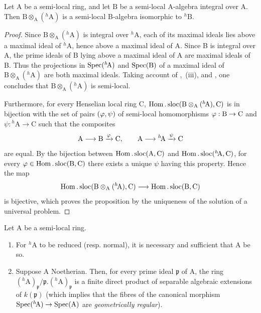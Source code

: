 \begin{proposition}[18.6.8]
\label{IV.18.6.8}
Let $\mathrm{A}$ be a semi-local ring, and let $\mathrm{B}$ be a semi-local A-algebra integral over $\mathrm{A}$.
Then $\mathrm{B}\otimes_{\mathrm{A}}({}^h\!\mathrm{A})$ is a semi-local B-algebra isomorphic to ${}^h\!\mathrm{B}$.
\end{proposition}

\begin{proof}
Since $\mathrm{B}\otimes_{\mathrm{A}}({}^h\!\mathrm{A})$ is integral over ${}^h\!\mathrm{A}$, each of its maximal ideals lies above a maximal ideal of ${}^h\!\mathrm{A}$, hence above a maximal ideal of A.  Since B is integral over A, the prime ideals of B lying above a maximal ideal of A are maximal ideals of B.  Thus the projections in $\operatorname{Spec}({}^h\!\mathrm{A})$ and $\operatorname{Spec}(\mathrm{B})$ of a maximal ideal of $\mathrm{B}\otimes_{\mathrm{A}}({}^h\!\mathrm{A})$ are both maximal ideals.  Taking account of ,~(iii), and , one concludes that $\mathrm{B}\otimes_{\mathrm{A}}({}^h\!\mathrm{A})$ is semi-local.

Furthermore, for every Henselian local ring C, $\operatorname{Hom}.\operatorname{sloc}(\mathrm{B}\otimes_{\mathrm{A}}({}^h\!\mathrm{A}),\mathrm{C})$ is in bijection with the set of pairs $(\varphi,\psi)$ of semi-local homomorphisms $\varphi:\mathrm{B}\to\mathrm{C}$ and $\psi:{}^h\!\mathrm{A}\to\mathrm{C}$ such that the composites
\[
  \mathrm{A}\longrightarrow\mathrm{B}\xrightarrow{\varphi}\mathrm{C},
  \qquad
  \mathrm{A}\longrightarrow{}^h\!\mathrm{A}\xrightarrow{\psi}\mathrm{C}
\]
are equal.  By the bijection between $\operatorname{Hom}.\operatorname{sloc}(\mathrm{A},\mathrm{C})$ and $\operatorname{Hom}.\operatorname{sloc}({}^h\!\mathrm{A},\mathrm{C})$, for every $\varphi\in\operatorname{Hom}.\operatorname{sloc}(\mathrm{B},\mathrm{C})$ there exists a unique $\psi$ having this property.  Hence the map
\[
  \operatorname{Hom}.\operatorname{sloc}(\mathrm{B}\otimes_{\mathrm{A}}({}^h\!\mathrm{A}),\mathrm{C})
  \longrightarrow \operatorname{Hom}.\operatorname{sloc}(\mathrm{B},\mathrm{C})
\]
is bijective, which proves the proposition by the uniqueness of the solution of a universal problem.
\end{proof}

\begin{theorem}[18.6.9]
\label{IV.18.6.9}
Let $\mathrm{A}$ be a semi-local ring.
\begin{enumerate}[label=\emph{\roman*)}]
  \item For ${}^h\!\mathrm{A}$ to be reduced (resp. normal), it is necessary and sufficient that A be so.
  \item Suppose A Noetherian.
  Then, for every prime ideal $\mathfrak{p}$ of A, the ring $({}^h\!\mathrm{A})_{\mathfrak{p}}/\mathfrak{p}.({}^h\!\mathrm{A})_{\mathfrak{p}}$ is a finite direct product of separable algebraic extensions of $k(\mathfrak{p})$ (which implies that the fibres of the canonical morphism $\operatorname{Spec}({}^h\!\mathrm{A})\to\operatorname{Spec}(\mathrm{A})$ are \emph{geometrically regular}).
\end{enumerate}
\end{theorem}

